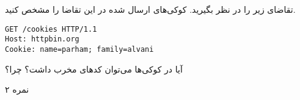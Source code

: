 

تقاضای زیر را در نظر بگیرید. کوکی‌های ارسال شده در این تقاضا را مشخص کنید.

\begin{latin}
\begin{verbatim}
GET /cookies HTTP/1.1
Host: httpbin.org
Cookie: name=parham; family=alvani
\end{verbatim}
\end{latin}

آیا در کوکی‌ها می‌توان کدهای مخرب داشت؟ چرا؟

۲ نمره
